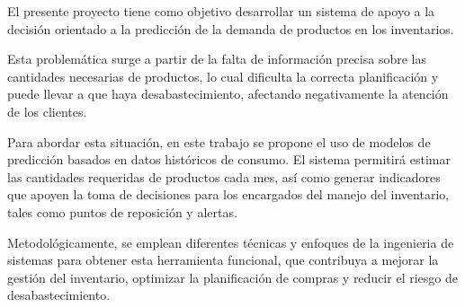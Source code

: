 
El presente proyecto tiene como objetivo desarrollar un sistema de apoyo a la decisión orientado a la predicción de la demanda de productos en los inventarios.

Esta problemática surge a partir de la falta de información precisa sobre las cantidades necesarias de productos, lo cual dificulta la correcta planificación y puede llevar a que haya desabastecimiento, afectando negativamente la atención de los clientes.

Para abordar esta situación, en este trabajo se propone el uso de modelos de predicción basados en datos históricos de consumo. El sistema permitirá estimar las cantidades requeridas de productos cada mes, así como generar indicadores que apoyen la toma de decisiones para los encargados del manejo del inventario, tales como puntos de reposición y alertas. 

Metodológicamente, se emplean diferentes técnicas y enfoques de la ingenieria de sistemas para obtener esta  herramienta funcional, que contribuya a mejorar la gestión del inventario, optimizar la planificación de compras y reducir el riesgo de desabastecimiento.